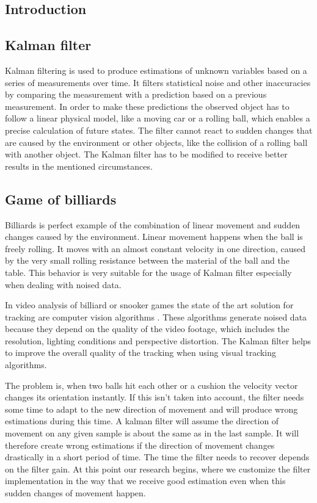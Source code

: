 \documentclass[notitlepage, a4paper, 11pt]{scrartcl}
\begin{document}
\begin{multicols}{2}
\section{Introduction}

\subsection{Kalman filter}

Kalman filtering is used to produce estimations of unknown variables based on a series of measurements over time.
It filters statistical noise and other inaccuracies by comparing the measurement with a prediction based on a previous measurement.
In order to make these predictions the observed object has to follow a linear physical model, like a moving car or a rolling ball, which enables a precise calculation of future states.
The filter cannot react to sudden changes that are caused by the environment or other objects, like the collision of a rolling ball with another object.
The Kalman filter has to be modified to receive better results in the mentioned circumstances.

\subsection{Game of billiards} \label{intro}

Billiards is perfect example of the combination of linear movement and sudden changes caused by the environment.
Linear movement happens when the ball is freely rolling. It moves with an almost constant velocity in one direction, caused by the very small rolling resistance between the material of the ball and the table.
This behavior is very suitable for the usage of Kalman filter especially when dealing with noised data.

In video analysis of billiard or snooker games the state of the art solution for tracking are computer vision algorithms \cite[p.~226]{fraenti2014structural}.
These algorithms generate noised data because they depend on the quality of the video footage, which includes the resolution, lighting conditions and perspective distortion.
The Kalman filter helps to improve the overall quality of the tracking when using visual tracking algorithms.

The problem is, when two balls hit each other or a cushion the velocity vector changes its orientation instantly. 
If this isn't taken into account, the filter needs some time to adapt to the new direction of movement and will produce wrong estimations during this time.
A kalman filter will assume the direction of movement on any given sample is about the same as in the last sample. 
It will therefore create wrong estimations if the direction of movement changes drastically in a short period of time. The time the filter needs to recover depends on the filter gain.
At this point our research begins, where we customize the filter implementation in the way that we receive good estimation even when this sudden changes of movement happen.


\end{multicols}
\end{document}
